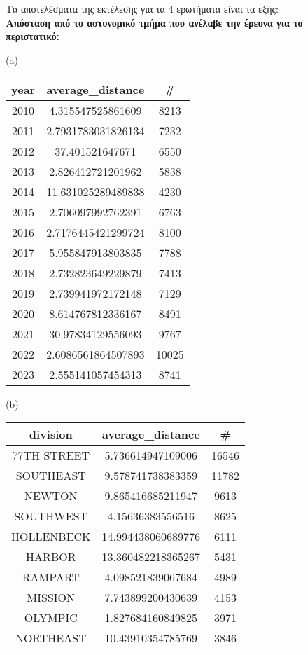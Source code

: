 \documentclass{article}
\begin{document}
Τα αποτελέσματα της εκτέλεσης για τα 4 ερωτήματα είναι τα εξής: \\

\noindent\textbf{Απόσταση από το αστυνομικό τμήμα που ανέλαβε την έρευνα για το περιστατικό:} \\

\begin{center}
(a)
\begin{tabular}{|c|c|c|}
\hline
\textbf{year} & \textbf{average\_distance} & \textbf{\#} \\
\hline
2010 & 4.315547525861609 & 8213 \\
2011 & 2.7931783031826134 & 7232 \\
2012 & 37.401521647671 & 6550 \\
2013 & 2.826412721201962 & 5838 \\
2014 & 11.631025289489838 & 4230 \\
2015 & 2.706097992762391 & 6763 \\
2016 & 2.7176445421299724 & 8100 \\
2017 & 5.955847913803835 & 7788 \\
2018 & 2.732823649229879 & 7413 \\
2019 & 2.739941972172148 & 7129 \\
2020 & 8.614767812336167 & 8491 \\
2021 & 30.97834129556093 & 9767 \\
2022 & 2.6086561864507893 & 10025 \\
2023 & 2.555141057454313 & 8741 \\
\hline
\end{tabular}
\quad
(b)
\begin{tabular}{|c|c|c|}
\hline
\textbf{division} & \textbf{average\_distance} & \textbf{\#} \\
\hline
77TH STREET & 5.736614947109006 & 16546 \\
SOUTHEAST & 9.578741738383359 & 11782 \\
NEWTON & 9.865416685211947 & 9613 \\
SOUTHWEST & 4.15636383556516 & 8625 \\
HOLLENBECK & 14.994438060689776 & 6111 \\
HARBOR & 13.360482218365267 & 5431 \\
RAMPART & 4.098521839067684 & 4989 \\
MISSION & 7.743899200430639 & 4153 \\
OLYMPIC & 1.827684160849825 & 3971 \\
NORTHEAST & 10.43910354785769 & 3846 \\

\end{tabular}
\end{center}
\end{document}
